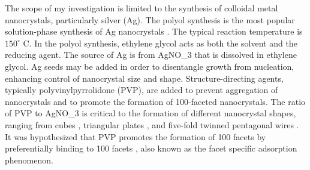 
The scope of my investigation is limited to the synthesis of colloidal metal nanocrystals, particularly silver (Ag).
The polyol synthesis is the most popular solution-phase synthesis of Ag nanocrystals \cite{Skrabalak_2007}.
The typical reaction temperature is $150^{\circ}$ C.
In the polyol synthesis, ethylene glycol acts as both the solvent and the reducing agent.
The source of Ag is from AgNO_3 that is dissolved in ethylene glycol.
Ag seeds may be added in order to disentangle growth from nucleation, enhancing control of nanocrystal size and shape.
Structure-directing agents, typically polyvinylpyrrolidone (PVP), are added to prevent aggregation of nanocrystals and to promote the formation of {100}-faceted nanocrystals.
The ratio of PVP to AgNO_3 is critical to the formation of different nanocrystal shapes, ranging from cubes \cite{Xia_2012,Zhang_2010}, triangular plates \cite{Lofton_2005,Liu_2012}, and five-fold twinned pentagonal wires \cite{Zhu_2011,Zhang_2008,Sun_2002}.
It was hypothesized that PVP promotes the formation of {100} facets by preferentially binding to {100} facets \cite{Xia_2012,Sun_2002}, also known as the facet specific adsorption phenomenon.